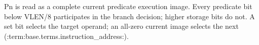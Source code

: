 Pn is read as a complete current predicate execution image. Every predicate
bit below VLEN/8 participates in the branch decision; higher storage bits do
not. A set bit selects the target operand; an all-zero current image selects
the next (:term:base.terms.instruction_address:).
